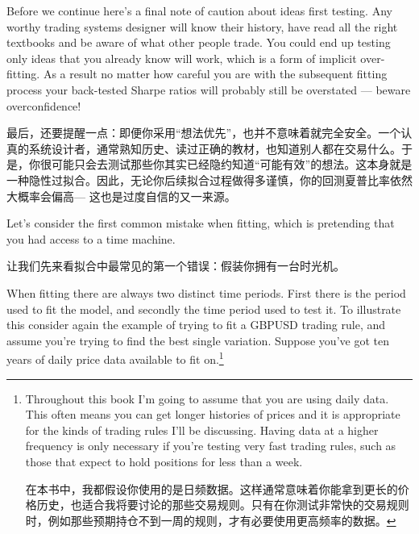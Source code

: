 \bipairgap

\begin{englishblock} Before we continue here's a final note of caution about ideas first testing. Any worthy trading systems designer will know their history, have read all the right textbooks and be aware of what other people trade. You could end up testing only ideas that you already know will work, which is a form of implicit over-fitting. As a result no matter how careful you are with the subsequent fitting process your back-tested Sharpe ratios will probably still be overstated --- beware overconfidence! \end{englishblock}

\begin{chineseblock}最后，还要提醒一点：即便你采用“想法优先”，也并不意味着就完全安全。一个认真的系统设计者，通常熟知历史、读过正确的教材，也知道别人都在交易什么。于是，你很可能只会去测试那些你其实已经隐约知道“可能有效”的想法。这本身就是一种隐性过拟合。因此，无论你后续拟合过程做得多谨慎，你的回测夏普比率依然大概率会偏高--- 这也是过度自信的又一来源。\end{chineseblock}


\begin{englishblock} Let's consider the first common mistake when fitting, which is pretending that you had access to a time machine. \end{englishblock}

\begin{chineseblock}让我们先来看拟合中最常见的第一个错误：假装你拥有一台时光机。\end{chineseblock}

\bipairgap

\begin{englishblock} When fitting there are always two distinct time periods. First there is the period used to fit the model, and secondly the time period used to test it. To illustrate this consider again the example of trying to fit a GBPUSD trading rule, and assume you're trying to find the best single variation. Suppose you've got ten years of daily price data available to fit on.\footnote{Throughout this book I'm going to assume that you are using daily data. This often means you can get longer histories of prices and it is appropriate for the kinds of trading rules I'll be discussing. Having data at a higher frequency is only necessary if you're testing very fast trading rules, such as those that expect to hold positions for less than a week. \par 在本书中，我都假设你使用的是日频数据。这样通常意味着你能拿到更长的价格历史，也适合我将要讨论的那些交易规则。只有在你测试非常快的交易规则时，例如那些预期持仓不到一周的规则，才有必要使用更高频率的数据。}\end{englishblock}

